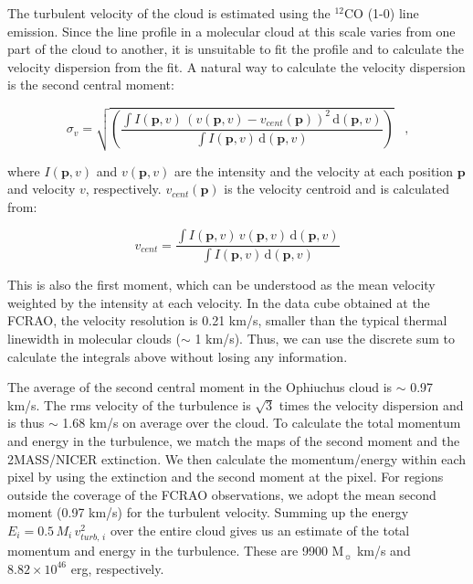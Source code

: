 \documentclass[11pt,a4paper]{emulateapj}
\begin{document}
The turbulent velocity of the cloud is estimated using the $^{12}$CO (1-0) line emission. Since the line profile in a molecular cloud at this scale varies from one part of the cloud to another, it is unsuitable to fit the profile and to calculate the velocity dispersion from the fit. A natural way to calculate the velocity dispersion is the second central moment:

\begin{equation}
\sigma_v = \sqrt{\left(\frac{\int{I(\mathbf{p}, v)\,(v(\mathbf{p}, v)-v_{cent}(\mathbf{p}))^2\,\text{d}(\mathbf{p}, v)}}{\int{I(\mathbf{p}, v)}\,\text{d}(\mathbf{p}, v)}\right)}\;\;\;\text{,}
\end{equation}

where $I(\mathbf{p}, v)$ and $v(\mathbf{p}, v)$ are the intensity and the velocity at each position $\mathbf{p}$ and velocity $v$, respectively. $v_{cent}(\mathbf{p})$ is the velocity centroid and is calculated from:

\begin{equation}
v_{cent} = \frac{\int{I(\mathbf{p}, v)\,v(\mathbf{p}, v)\,\text{d}(\mathbf{p}, v)}}{\int{I(\mathbf{p}, v)\,\text{d}(\mathbf{p}, v)}}
\end{equation}

This is also the first moment, which can be understood as the mean velocity weighted by the intensity at each velocity. In the data cube obtained at the FCRAO, the velocity resolution is 0.21 km/s, smaller than the typical thermal linewidth in molecular clouds ($\sim$ 1 km/s). Thus, we can use the discrete sum to calculate the integrals above without losing any information.

The average of the second central moment in the Ophiuchus cloud is $\sim$ 0.97 km/s. The rms velocity of the turbulence is $\sqrt{3}$ times the velocity dispersion and is thus $\sim$ 1.68 km/s on average over the cloud. To calculate the total momentum and energy in the turbulence, we match the maps of the second moment and the 2MASS/NICER extinction. We then calculate the momentum/energy within each pixel by using the extinction and the second moment at the pixel. For regions outside the coverage of the FCRAO observations, we adopt the mean second moment (0.97 km/s) for the turbulent velocity. Summing up the energy $E_i = 0.5\,M_i\,v_{turb,\,i}^2$ over the entire cloud gives us an estimate of the total momentum and energy in the turbulence. These are 9900 M$_{\sun}$ km/s and $8.82\times10^{46}$ erg, respectively.
\end{document}
